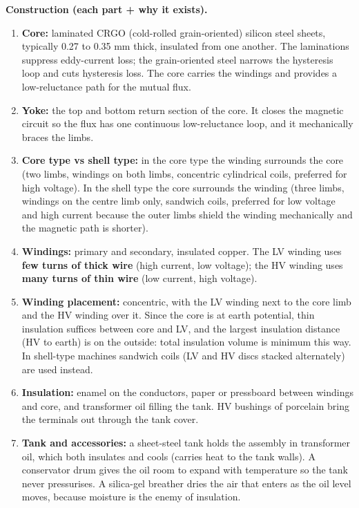 \documentclass[11pt]{article}
\begin{document}
\textbf{Construction (each part + why it exists).}
\begin{enumerate}[label=\arabic*.]
\item \textbf{Core:} laminated CRGO (cold-rolled grain-oriented) silicon steel sheets, typically 0.27 to 0.35 mm thick, insulated from one another. The laminations suppress eddy-current loss; the grain-oriented steel narrows the hysteresis loop and cuts hysteresis loss. The core carries the windings and provides a low-reluctance path for the mutual flux.
\item \textbf{Yoke:} the top and bottom return section of the core. It closes the magnetic circuit so the flux has one continuous low-reluctance loop, and it mechanically braces the limbs.
\item \textbf{Core type vs shell type:} in the core type the winding surrounds the core (two limbs, windings on both limbs, concentric cylindrical coils, preferred for high voltage). In the shell type the core surrounds the winding (three limbs, windings on the centre limb only, sandwich coils, preferred for low voltage and high current because the outer limbs shield the winding mechanically and the magnetic path is shorter).
\item \textbf{Windings:} primary and secondary, insulated copper. The LV winding uses \textbf{few turns of thick wire} (high current, low voltage); the HV winding uses \textbf{many turns of thin wire} (low current, high voltage).
\item \textbf{Winding placement:} concentric, with the LV winding next to the core limb and the HV winding over it. Since the core is at earth potential, thin insulation suffices between core and LV, and the largest insulation distance (HV to earth) is on the outside: total insulation volume is minimum this way. In shell-type machines sandwich coils (LV and HV discs stacked alternately) are used instead.
\item \textbf{Insulation:} enamel on the conductors, paper or pressboard between windings and core, and transformer oil filling the tank. HV bushings of porcelain bring the terminals out through the tank cover.
\item \textbf{Tank and accessories:} a sheet-steel tank holds the assembly in transformer oil, which both insulates and cools (carries heat to the tank walls). A conservator drum gives the oil room to expand with temperature so the tank never pressurises. A silica-gel breather dries the air that enters as the oil level moves, because moisture is the enemy of insulation.
\end{enumerate}
\end{document}

